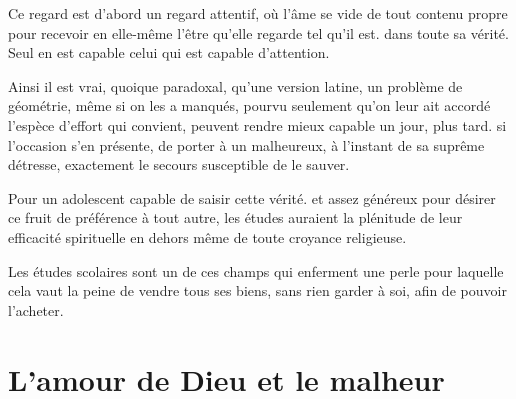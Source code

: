 \documentclass[french,twoside]{book} %
\newcommand\chapteropen{} %
\newcommand\chapterclose{} %
\begin{document}
Ce regard est d'abord un regard attentif, où l'âme se vide de tout contenu propre pour recevoir en elle-même l'être qu'elle regarde tel qu'il est. dans toute sa vérité. Seul en est capable celui qui est capable d'attention.\par
Ainsi il est vrai, quoique paradoxal, qu'une version latine, un problème de géométrie, même si on les a manqués, pourvu seulement qu'on leur ait accordé l'espèce d'effort qui convient, peuvent rendre mieux capable un jour, plus tard. si l'occasion s'en présente, de porter à un malheureux, à l'instant de sa suprême détresse, exactement le secours susceptible de le sauver.\par
Pour un adolescent capable de saisir cette vérité. et assez généreux pour désirer ce fruit de préférence à tout autre, les études auraient la plénitude de leur efficacité spirituelle en dehors même de toute croyance religieuse.\par
Les études scolaires sont un de ces champs qui enferment une perle pour laquelle cela vaut la peine de vendre tous ses biens, sans rien garder à soi, afin de pouvoir l'acheter.\par

\begin{center}
\end{center}
\chapterclose


\chapteropen
\chapter[L'amour de Dieu et le malheur]{L'amour de Dieu et le malheur}
\end{document}
